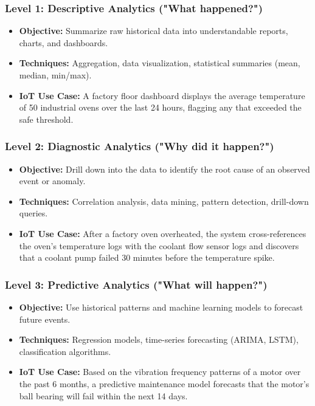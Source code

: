 \subsubsection{Level 1: Descriptive Analytics ("What happened?")}
\begin{itemize}
  \item   \textbf{Objective:} Summarize raw historical data into understandable reports, charts, and dashboards.
  \item   \textbf{Techniques:} Aggregation, data visualization, statistical summaries (mean, median, min/max).
  \item   \textbf{IoT Use Case:} A factory floor dashboard displays the average temperature of 50 industrial ovens over the last 24 hours, flagging any that exceeded the safe threshold.
\end{itemize}

\subsubsection{Level 2: Diagnostic Analytics ("Why did it happen?")}
\begin{itemize}
  \item   \textbf{Objective:} Drill down into the data to identify the root cause of an observed event or anomaly.
  \item   \textbf{Techniques:} Correlation analysis, data mining, pattern detection, drill-down queries.
  \item   \textbf{IoT Use Case:} After a factory oven overheated, the system cross-references the oven's temperature logs with the coolant flow sensor logs and discovers that a coolant pump failed 30 minutes before the temperature spike.
\end{itemize}

\subsubsection{Level 3: Predictive Analytics ("What will happen?")}
\begin{itemize}
  \item   \textbf{Objective:} Use historical patterns and machine learning models to forecast future events.
  \item   \textbf{Techniques:} Regression models, time-series forecasting (ARIMA, LSTM), classification algorithms.
  \item   \textbf{IoT Use Case:} Based on the vibration frequency patterns of a motor over the past 6 months, a predictive maintenance model forecasts that the motor's ball bearing will fail within the next 14 days.
\end{itemize}

